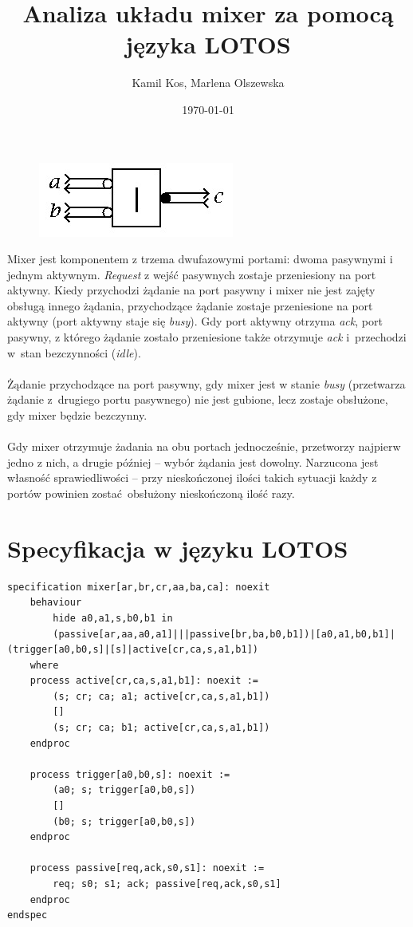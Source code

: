 \documentclass[12pt, a4paper, notitlepage]{article}
\title{Analiza układu mixer za pomocą języka LOTOS}
\author{Kamil Kos, Marlena Olszewska}
\date{\today}
\begin{document}
{\let\newpage\relax\maketitle}

\thispagestyle{empty}
\begin{figure}[!htb]
	\centering
\includegraphics[scale=1]{cd}
\end{figure}

Mixer jest komponentem z trzema dwufazowymi portami: dwoma pasywnymi i jednym aktywnym. \textit{Request} z wejść pasywnych zostaje przeniesiony na port aktywny. Kiedy przychodzi żądanie na port pasywny i mixer nie jest zajęty obsługą innego żądania, przychodzące żądanie zostaje przeniesione na port aktywny (port aktywny staje się \textit{busy}). Gdy port aktywny otrzyma \textit{ack}, port pasywny, z którego żądanie zostało przeniesione także otrzymuje \textit{ack} i~przechodzi w~stan bezczynności (\textit{idle}).
\\\\
Żądanie przychodzące na port pasywny, gdy mixer jest w stanie \textit{busy} (przetwarza żądanie z~drugiego portu pasywnego) nie jest gubione, lecz zostaje obsłużone, gdy mixer będzie bezczynny.
\\\\
Gdy mixer otrzymuje żadania na obu portach jednocześnie, przetworzy najpierw jedno z nich, a drugie później -- wybór żądania jest dowolny. Narzucona jest własność sprawiedliwości -- przy nieskończonej ilości takich sytuacji każdy z portów powinien zostać obsłużony nieskończoną ilość razy.

\newpage
\thispagestyle{empty}
\section*{Specyfikacja w języku LOTOS}
\begin{lstlisting}
specification mixer[ar,br,cr,aa,ba,ca]: noexit
	behaviour
		hide a0,a1,s,b0,b1 in
		(passive[ar,aa,a0,a1]|||passive[br,ba,b0,b1])|[a0,a1,b0,b1]|(trigger[a0,b0,s]|[s]|active[cr,ca,s,a1,b1])
	where
	process active[cr,ca,s,a1,b1]: noexit :=
		(s; cr; ca; a1; active[cr,ca,s,a1,b1])
		[]
		(s; cr; ca; b1; active[cr,ca,s,a1,b1])
	endproc
	
	process trigger[a0,b0,s]: noexit :=
		(a0; s; trigger[a0,b0,s])
		[]
		(b0; s; trigger[a0,b0,s])
	endproc
	
	process passive[req,ack,s0,s1]: noexit :=
		req; s0; s1; ack; passive[req,ack,s0,s1]
	endproc
endspec


\end{lstlisting}
\end{document}
